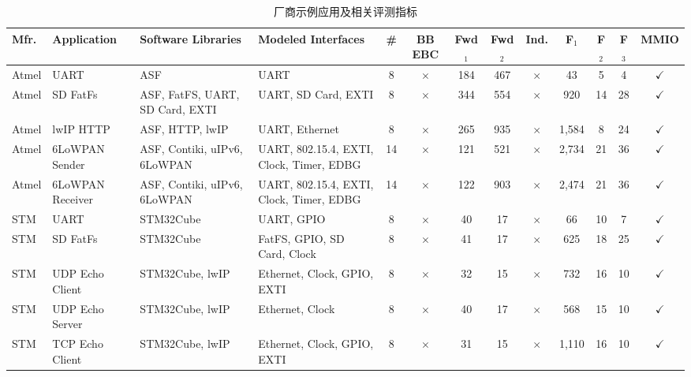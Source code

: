 
\begin{table}[p]
\centering
\caption{厂商示例应用及相关评测指标}
\label{tab:vendor_apps_metrics}
\footnotesize
\setlength{\tabcolsep}{3pt}
\begin{adjustbox}{max width=\textwidth}
\begin{tabular}{@{}llp{2.3cm}p{4.1cm}ccccccccc@{}}
\toprule
\textbf{Mfr.} &
\textbf{Application} &
\textbf{Software Libraries} &
\textbf{Modeled Interfaces} &
\textbf{\#} &
\textbf{BB EBC} &
\textbf{Fwd$_1$} & \textbf{Fwd$_2$} &
\textbf{Ind.} & \textbf{F$_1$} & \textbf{F$_2$} & \textbf{F$_3$} &
\textbf{MMIO} \\
\midrule
Atmel & UART & ASF & UART & 8 & $\times$ & 184 & 467 & $\times$ & 43 & 5 & 4 & $\checkmark$ \\
Atmel & SD FatFs & ASF, FatFS, UART, SD Card, EXTI & UART, SD Card, EXTI & 8 & $\times$ & 344 & 554 & $\times$ & 920 & 14 & 28 & $\checkmark$ \\
Atmel & lwIP HTTP & ASF, HTTP, lwIP & UART, Ethernet & 8 & $\times$ & 265 & 935 & $\times$ & 1,584 & 8 & 24 & $\checkmark$ \\
Atmel & 6LoWPAN Sender & ASF, Contiki, uIPv6, 6LoWPAN & UART, 802.15.4, EXTI, Clock, Timer, EDBG & 14 & $\times$ & 121 & 521 & $\times$ & 2,734 & 21 & 36 & $\checkmark$ \\
Atmel & 6LoWPAN Receiver & ASF, Contiki, uIPv6, 6LoWPAN & UART, 802.15.4, EXTI, Clock, Timer, EDBG & 14 & $\times$ & 122 & 903 & $\times$ & 2,474 & 21 & 36 & $\checkmark$ \\
STM & UART & STM32Cube & UART, GPIO & 8 & $\times$ & 40 & 17 & $\times$ & 66 & 10 & 7 & $\checkmark$ \\
STM & SD FatFs & STM32Cube & FatFS, GPIO, SD Card, Clock & 8 & $\times$ & 41 & 17 & $\times$ & 625 & 18 & 25 & $\checkmark$ \\
STM & UDP Echo Client & STM32Cube, lwIP & Ethernet, Clock, GPIO, EXTI & 8 & $\times$ & 32 & 15 & $\times$ & 732 & 16 & 10 & $\checkmark$ \\
STM & UDP Echo Server & STM32Cube, lwIP & Ethernet, Clock & 8 & $\times$ & 40 & 17 & $\times$ & 568 & 15 & 10 & $\checkmark$ \\
STM & TCP Echo Client & STM32Cube, lwIP & Ethernet, Clock, GPIO, EXTI & 8 & $\times$ & 31 & 15 & $\times$ & 1,110 & 16 & 10 & $\checkmark$ \\

\end{tabular}
\end{adjustbox}
\end{table}
